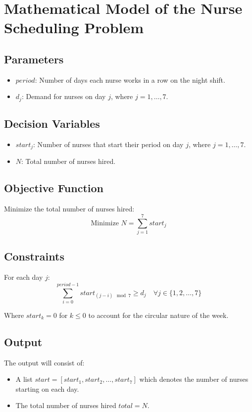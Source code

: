 \documentclass{article}
\begin{document}
\section*{Mathematical Model of the Nurse Scheduling Problem}

\subsection*{Parameters}
\begin{itemize}
    \item $period$: Number of days each nurse works in a row on the night shift.
    \item $d_j$: Demand for nurses on day $j$, where $j = 1, \ldots, 7$.
\end{itemize}

\subsection*{Decision Variables}
\begin{itemize}
    \item $start_j$: Number of nurses that start their period on day $j$, where $j = 1, \ldots, 7$.
    \item $N$: Total number of nurses hired.
\end{itemize}

\subsection*{Objective Function}
Minimize the total number of nurses hired:
\[
\text{Minimize } N = \sum_{j=1}^{7} start_j
\]

\subsection*{Constraints}
For each day $j$:
\[
\sum_{i=0}^{period-1} start_{(j-i) \mod 7} \geq d_j \quad \forall j \in \{1, 2, \ldots, 7\}
\]

Where $start_k = 0$ for $k \leq 0$ to account for the circular nature of the week.

\subsection*{Output}
The output will consist of:
\begin{itemize}
    \item A list $start = [start_1, start_2, \ldots, start_7]$ which denotes the number of nurses starting on each day.
    \item The total number of nurses hired $total = N$.
\end{itemize}
\end{document}
